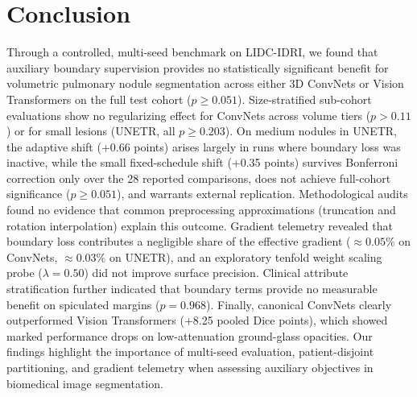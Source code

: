 \documentclass[10pt, a4paper, twocolumn]{article}
\begin{document}
\section{Conclusion}
Through a controlled, multi-seed benchmark on LIDC-IDRI, we found that auxiliary boundary supervision provides no statistically significant benefit for volumetric pulmonary nodule segmentation across either 3D ConvNets or Vision Transformers on the full test cohort ($p \ge 0.051$). Size-stratified sub-cohort evaluations show no regularizing effect for ConvNets across volume tiers ($p > 0.11$) or for small lesions (UNETR, all $p \ge 0.203$). On medium nodules in UNETR, the adaptive shift (+0.66 points) arises largely in runs where boundary loss was inactive, while the small fixed-schedule shift (+0.35 points) survives Bonferroni correction only over the 28 reported comparisons, does not achieve full-cohort significance ($p \ge 0.051$), and warrants external replication. Methodological audits found no evidence that common preprocessing approximations (truncation and rotation interpolation) explain this outcome. Gradient telemetry revealed that boundary loss contributes a negligible share of the effective gradient ($\approx0.05\%$ on ConvNets, $\approx0.03\%$ on UNETR), and an exploratory tenfold weight scaling probe ($\lambda = 0.50$) did not improve surface precision. Clinical attribute stratification further indicated that boundary terms provide no measurable benefit on spiculated margins ($p=0.968$). Finally, canonical ConvNets clearly outperformed Vision Transformers (+8.25 pooled Dice points), which showed marked performance drops on low-attenuation ground-glass opacities. Our findings highlight the importance of multi-seed evaluation, patient-disjoint partitioning, and gradient telemetry when assessing auxiliary objectives in biomedical image segmentation.
\end{document}
